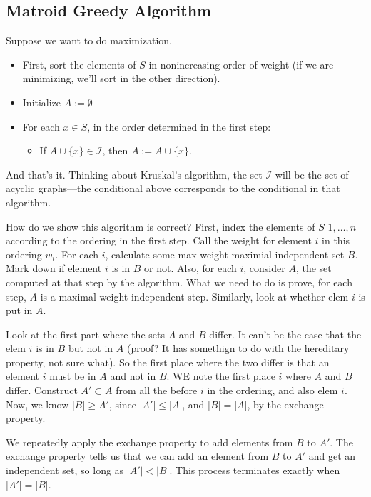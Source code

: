 \documentclass{article}
\begin{document}
\subsection{Matroid Greedy Algorithm}

Suppose we want to do maximization.
\begin{itemize}

\item
First, sort the elements of $S$ in nonincreasing order of weight (if we
are minimizing, we'll sort in the other direction).

\item
Initialize
$
A := \emptyset
$

\item
For each $x\in S$, in the order determined in the first step:
	\begin{itemize}
		\item
		If $A\cup \{x\} \in \mathcal I$, then $A := A \cup \{x\}$.
	\end{itemize}
\end{itemize}
And that's it.
Thinking about Kruskal's algorithm, the set $\mathcal I$ will be the set
of acyclic graphs---the conditional above corresponds to the conditional
in that algorithm.


How do we show this algorithm is correct?
First, index the elements of $S$ $1,\ldots,n$ according to the
ordering in the first step.
Call the weight for element $i$ in this ordering $w_i$.
For each $i$, calculate some max-weight maximial independent set $B$.
Mark down if element $i$ is in $B$ or not.
Also, for each $i$, consider $A$, the set computed at that step by the algorithm.
What we need to do is prove, for each step, $A$ is a maximal weight independent step.
Similarly, look at whether elem $i$ is put in $A$.

Look at the first part where the sets $A$ and $B$ differ.
It can't be the case that the elem $i$ is in $B$ but not in $A$ (proof? It has
somethign to do with the hereditary property, not sure what).
So the first place where the two differ is that an element $i$ must
be in $A$ and not in $B$.
WE note the first place $i$ where $A$ and $B$ differ.
Construct $A'\subset A$ from all the before $i$ in the ordering, and also elem $i$.
Now, we know $|B| \geq A'$, since $|A'| \leq |A|$, and $|B| = |A|$, by the
exchange property.

We repeatedly apply the exchange property to add elements from $B$ to $A'$.
The exchange property tells us that we can add an element from $B$ to $A'$
and get an independent set, so long as $|A'| < |B|$.
This process terminates exactly when $|A'| = |B|$.
\end{document}
